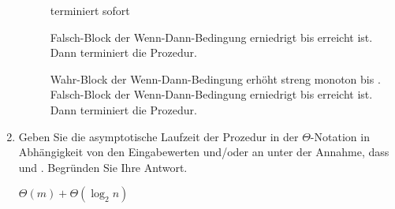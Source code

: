 \documentclass{lehramt-informatik-aufgabe}
\begin{document}
\begin{enumerate}
\begin{liAntwort}
\begin{description}
\item[]

terminiert sofort

\item[]

Falsch-Block der Wenn-Dann-Bedingung erniedrigt  bis  erreicht
ist. Dann terminiert die Prozedur.

\item[]

Wahr-Block der Wenn-Dann-Bedingung erhöht  streng monoton bis . Falsch-Block der Wenn-Dann-Bedingung erniedrigt  bis 
erreicht ist. Dann terminiert die Prozedur.

\end{description}
\end{liAntwort}


\item Geben Sie die asymptotische Laufzeit der Prozedur  in
der $\Theta$-Notation in Abhängigkeit von den Eingabewerten 
und/oder  an unter der Annahme, dass  und .
Begründen Sie Ihre Antwort.

\begin{liAntwort}
$\Theta(m) + \Theta(\log_2 n)$
\end{liAntwort}

\end{enumerate}
\end{document}
